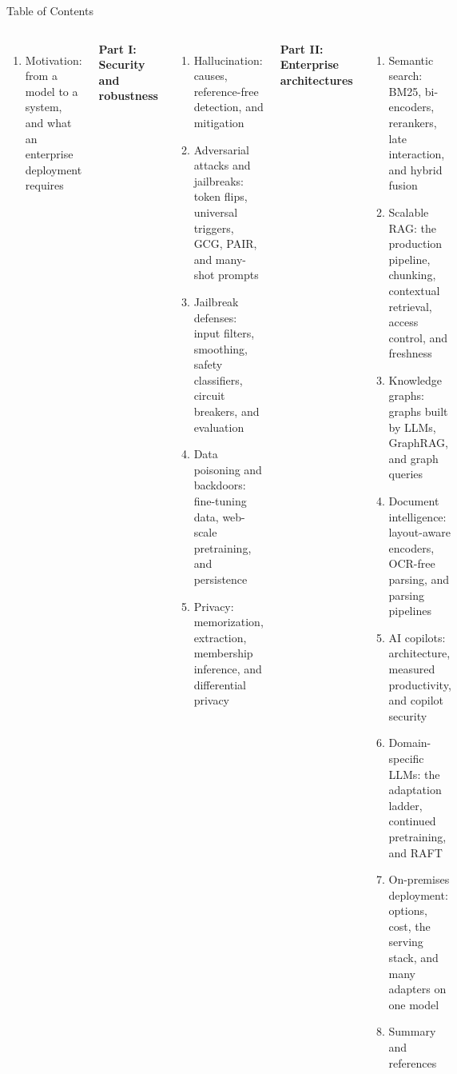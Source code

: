 \begin{frame}{Table of Contents}
  \begin{columns}[T,onlytextwidth]
      \begin{enumerate}\itemsep0.3em\footnotesize
        \item Motivation: from a model to a system, and what an enterprise deployment requires
      \end{enumerate}
      \vspace{0.5em}
      {\footnotesize\textbf{Part I: Security and robustness}\par}
      \vspace{0.3em}
      \begin{enumerate}\itemsep0.3em\footnotesize
        \setcounter{enumi}{1}
        \item Hallucination: causes, reference-free detection, and mitigation
        \item Adversarial attacks and jailbreaks: token flips, universal triggers, GCG, PAIR, and many-shot prompts
        \item Jailbreak defenses: input filters, smoothing, safety classifiers, circuit breakers, and evaluation
        \item Data poisoning and backdoors: fine-tuning data, web-scale pretraining, and persistence
        \item Privacy: memorization, extraction, membership inference, and differential privacy
      \end{enumerate}
      {\footnotesize\textbf{Part II: Enterprise architectures}\par}
      \vspace{0.3em}
      \begin{enumerate}\itemsep0.3em\footnotesize
        \setcounter{enumi}{6}
        \item Semantic search: BM25, bi-encoders, rerankers, late interaction, and hybrid fusion
        \item Scalable RAG: the production pipeline, chunking, contextual retrieval, access control, and freshness
        \item Knowledge graphs: graphs built by LLMs, GraphRAG, and graph queries
        \item Document intelligence: layout-aware encoders, OCR-free parsing, and parsing pipelines
        \item AI copilots: architecture, measured productivity, and copilot security
        \item Domain-specific LLMs: the adaptation ladder, continued pretraining, and RAFT
        \item On-premises deployment: options, cost, the serving stack, and many adapters on one model
        \item Summary and references
      \end{enumerate}
  \end{columns}
\end{frame}
